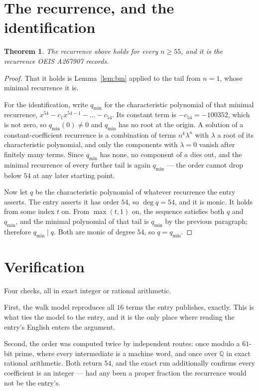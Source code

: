 \documentclass[11pt,a4paper]{article}
\theoremstyle{plain}
\newtheorem{theorem}{Theorem}
\theoremstyle{definition}
\begin{document}
\section{The recurrence, and the identification}

\begin{theorem}
The recurrence above holds for every $n\ge55$, and it is the recurrence OEIS A267907 records.
\end{theorem}

\begin{proof}
That it holds is Lemma~\ref{lem:bm} applied to the tail from $n=1$, whose minimal
recurrence it is.

For the identification, write $q_{\min}$ for the characteristic polynomial of that minimal
recurrence, $x^{54}-c_1x^{54-1}-\dots-c_{54}$. Its constant term is
$-c_{54}=-100352$, which is not zero, so $q_{\min}(0)\neq0$ and $q_{\min}$ has no
root at the origin. A solution of a constant-coefficient recurrence is a combination of terms
$n^{k}\lambda^{n}$ with $\lambda$ a root of its characteristic polynomial, and only the
components with $\lambda=0$ vanish after finitely many terms. Since $q_{\min}$ has none, no
component of $a$ dies out, and the minimal recurrence of every further tail is again
$q_{\min}$ --- the order cannot drop below $54$ at any later starting point.

Now let $q$ be the characteristic polynomial of whatever recurrence the entry asserts. The
entry asserts it has order $54$, so $\deg q=54$, and it is monic. It holds from some
index $t$ on. From $\max(t,1)$ on, the sequence satisfies both $q$ and $q_{\min}$, and
the minimal polynomial of that tail is $q_{\min}$ by the previous paragraph; therefore
$q_{\min}\mid q$. Both are monic of degree $54$, so $q=q_{\min}$.
\end{proof}

\section{Verification}

Four checks, all in exact integer or rational arithmetic.

First, the walk model reproduces all $16$ terms the entry publishes, exactly. This is
what ties the model to the entry, and it is the only place where reading the entry's English
enters the argument.

Second, the order was computed twice by independent routes: once modulo a $61$-bit prime, where
every intermediate is a machine word, and once over $\mathbb{Q}$ in exact rational arithmetic.
Both return $54$, and the exact run additionally confirms every coefficient is an integer
--- had any been a proper fraction the recurrence would not be the entry's.
\end{document}
